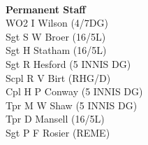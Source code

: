 \begin{multicols}{2}
  \\
  \textbf{Permanent Staff} \\
  WO2 I Wilson (4/7DG) \\
  Sgt S W Broer (16/5L) \\
  Sgt H Statham (16/5L) \\
  Sgt R Hesford (5 INNIS DG) \\
  Scpl R V Birt (RHG/D) \\
  Cpl H P Conway (5 INNIS DG) \\
  Tpr M W Shaw (5 INNIS DG) \\
  Tpr D Mansell (16/5L) \\
  Sgt P F Rosier (REME) \\
\end{multicols}
